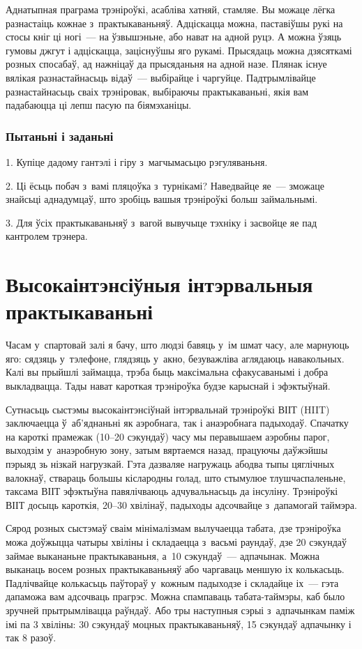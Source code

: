 Аднатыпная праграма трэніроўкі, асабліва хатняй, стамляе. Вы можаце лёгка разнастаіць кожнае з~практыкаваньняў. Адціскацца можна, паставіўшы рукі на стосы кніг ці ногі~--- на ўзвышэньне, або нават на адной руцэ. А можна ўзяць гумовы джгут і адціскацца, заціснуўшы яго рукамі. Прысядаць можна дзясяткамі розных спосабаў, ад нажніцаў да прысяданьня на адной назе. Плянак існуе вялікая разнастайнасьць відаў~--- выбірайце і чаргуйце. Падтрымлівайце разнастайнасьць сваіх трэніровак, выбіраючы практыкаваньні, якія вам падабаюцца ці лепш пасую па біямэханіцы.

\subsubsection{Пытаньні і заданьні}

1. Купіце дадому гантэлі і гіру з~магчымасьцю рэгуляваньня.

2. Ці ёсьць побач з~вамі пляцоўка з~турнікамі? Наведвайце яе~--- зможаце знайсьці аднадумцаў, што зробіць вашыя трэніроўкі больш займальнымі.

3. Для ўсіх практыкаваньняў з~вагой вывучыце тэхніку і засвойце яе пад кантролем трэнера.


\section{Высокаінтэнсіўныя інтэрвальныя практыкаваньні}

Часам у~спартовай залі я бачу, што людзі бавяць у~ім шмат часу, але марнуюць яго: сядзяць у~тэлефоне, глядзяць у~акно, безуважліва аглядаюць навакольных. Калі вы прыйшлі займацца, трэба быць максімальна сфакусаванымі і добра выкладвацца. Тады нават кароткая трэніроўка будзе карыснай і эфэктыўнай.

Сутнасьць сыстэмы высокаінтэнсіўнай інтэрвальнай трэніроўкі ВІІТ (HIIT) заключаецца ў~аб'яднаньні як аэробнага, так і анаэробнага падыходаў. Спачатку на кароткі прамежак (10--20 сэкундаў) часу мы перавышаем аэробны парог, выходзім у~анаэробную зону, затым вяртаемся назад, працуючы даўжэйшы пэрыяд зь нізкай нагрузкай. Гэта дазваляе нагружаць абодва тыпы цяглічных валокнаў, ствараць большы кіслародны голад, што стымулюе тлушчаспаленьне, таксама ВІІТ эфэктыўна павялічваюць адчувальнасьць да інсуліну. Трэніроўкі ВІІТ досыць кароткія, 20--30 хвілінаў, падыходы адсочвайце з~дапамогай таймэра.

Сярод розных сыстэмаў сваім мінімалізмам вылучаецца табата, дзе трэніроўка можа доўжыцца чатыры хвіліны і складаецца з~васьмі раундаў, дзе 20 сэкундаў займае выкананьне практыкаваньня, а~10 сэкундаў~--- адпачынак. Можна выканаць восем розных практыкаваньняў або чаргаваць меншую іх колькасьць. Падлічвайце колькасьць паўтораў у~кожным падыходзе і складайце іх~--- гэта дапаможа вам адсочваць прагрэс. Можна спампаваць табата-таймэры, каб было зручней прытрымлівацца раўндаў. Або тры наступныя сэрыі з~адпачынкам паміж імі па 3 хвіліны: 30 сэкундаў моцных практыкаваньняў, 15 сэкундаў адпачынку і так 8 разоў.

